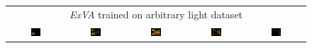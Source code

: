 \begin{figure}[!htb]
\begin{tabular*}{\textwidth}{ c c c c c }
        
        \multicolumn{5}{c}{\textit{ExVA} trained on arbitrary light dataset} \\
          \includegraphics[width=0.19\textwidth]{figures/results/arb_set/dynamic_light/exva_rand_vc0_ld-90.png}
        & \includegraphics[width=0.19\textwidth]{figures/results/arb_set/dynamic_light/exva_rand_vc0_ld-60.png}
        & \includegraphics[width=0.19\textwidth]{figures/results/arb_set/dynamic_light/exva_rand_vc0_ld0.png}
        & \includegraphics[width=0.19\textwidth]{figures/results/arb_set/dynamic_light/exva_rand_vc0_ld60.png} 
        & \includegraphics[width=0.19\textwidth]{figures/results/arb_set/dynamic_light/exva_rand_vc0_ld90.png} \\
        

\end{tabular*}
\end{figure}
